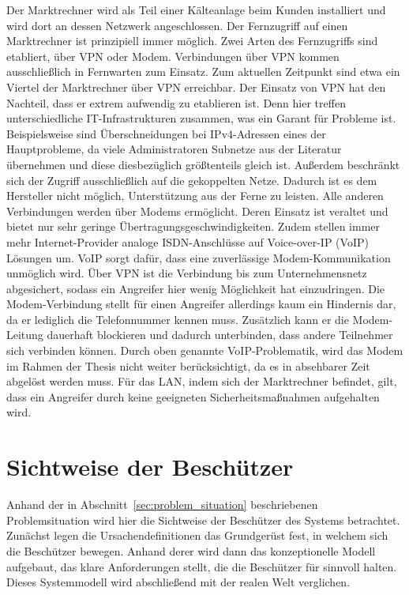 \documentclass[11pt,a4paper]{report}
\begin{document}
Der Marktrechner wird als Teil einer Kälteanlage beim Kunden installiert und wird dort an dessen Netzwerk angeschlossen. Der Fernzugriff auf einen Marktrechner ist prinzipiell immer möglich. Zwei Arten des Fernzugriffs sind etabliert, über VPN oder Modem. Verbindungen über VPN kommen ausschließlich in Fernwarten zum Einsatz. Zum aktuellen Zeitpunkt sind etwa ein Viertel der Marktrechner über VPN erreichbar. Der Einsatz von VPN hat den Nachteil, dass er extrem aufwendig zu etablieren ist. Denn hier treffen unterschiedliche IT-Infrastrukturen zusammen, was ein Garant für Probleme ist. Beispielsweise sind Überschneidungen bei IPv4-Adressen eines der Hauptprobleme, da viele Administratoren Subnetze aus der Literatur übernehmen und diese diesbezüglich größtenteils gleich ist. Außerdem beschränkt sich der Zugriff ausschließlich auf die gekoppelten Netze. Dadurch ist es dem Hersteller nicht möglich, Unterstützung aus der Ferne zu leisten. Alle anderen Verbindungen werden über Modems ermöglicht. Deren Einsatz ist veraltet und bietet nur sehr geringe Übertragungsgeschwindigkeiten. Zudem stellen immer mehr Internet-Provider analoge ISDN-Anschlüsse auf Voice-over-IP (VoIP) Lösungen um. VoIP sorgt dafür, dass eine zuverlässige Modem-Kommunikation unmöglich wird. Über VPN ist die Verbindung bis zum Unternehmensnetz abgesichert, sodass ein Angreifer hier wenig Möglichkeit hat einzudringen. Die Modem-Verbindung stellt für einen Angreifer allerdings kaum ein Hindernis dar, da er lediglich die Telefonnummer kennen muss. Zusätzlich kann er die Modem-Leitung dauerhaft blockieren und dadurch unterbinden, dass andere Teilnehmer sich verbinden können. Durch oben genannte VoIP-Problematik, wird das Modem im Rahmen der Thesis nicht weiter berücksichtigt, da es in absehbarer Zeit abgelöst werden muss. Für das LAN, indem sich der Marktrechner befindet, gilt, dass ein Angreifer durch keine geeigneten Sicherheitsmaßnahmen aufgehalten wird.

\section{Sichtweise der Beschützer} 

Anhand der in Abschnitt~\ref{sec:problem_situation} beschriebenen Problemsituation wird hier die Sichtweise der Beschützer des Systems betrachtet. Zunächst legen die Ursachendefinitionen das Grundgerüst fest, in welchem sich die Beschützer bewegen. Anhand derer wird dann das konzeptionelle Modell aufgebaut, das klare Anforderungen stellt, die die Beschützer für sinnvoll halten. Dieses Systemmodell wird abschließend mit der realen Welt verglichen.
\end{document}
